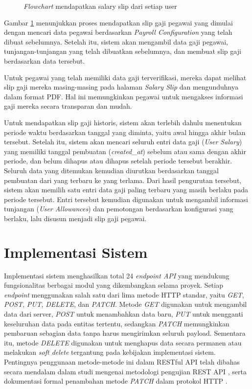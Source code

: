 \begin{figure}[H]
    \caption{\textit{Flowchart} mendapatkan salary slip dari setiap user}
    \label{fig:mendapatkan_salary_slip_dari_setiap_user}
\end{figure}

Gambar \ref{fig:mendapatkan_salary_slip_dari_setiap_user} menunjukkan proses mendapatkan slip gaji pegawai yang dimulai dengan mencari data pegawai berdasarkan \textit{Payroll Configuration} yang telah dibuat sebelumnya. Setelah itu, sistem akan mengambil data gaji pegawai, tunjangan-tunjangan yang telah dibuatkan sebelumnya, dan membuat slip gaji berdasarkan data tersebut. 

Untuk pegawai yang telah memiliki data gaji terverifikasi, mereka dapat melihat slip gaji mereka masing-masing pada halaman \textit{Salary Slip} dan mengunduhnya dalam format PDF. Hal ini memungkinkan pegawai untuk mengakses informasi gaji mereka secara transparan dan mudah.

Untuk mendapatkan slip gaji historis, sistem akan terlebih dahulu menentukan periode waktu berdasarkan tanggal yang diminta, yaitu awal hingga akhir bulan tersebut. Setelah itu, sistem akan mencari seluruh entri data gaji (\textit{User Salary}) yang memiliki tanggal pembuatan (\textit{created\_at}) sebelum atau sama dengan akhir periode, dan belum dihapus atau dihapus setelah periode tersebut berakhir. Seluruh data yang ditemukan kemudian diurutkan berdasarkan tanggal pembuatan dari yang terbaru ke yang terlama. Dari hasil pengurutan tersebut, sistem akan memilih satu entri data gaji paling terbaru yang masih berlaku pada periode tersebut. Entri tersebut kemudian digunakan untuk mengambil informasi tunjangan (\textit{User Allowances}) dan pemotongan berdasarkan konfigurasi yang berlaku, lalu disusun menjadi slip gaji pegawai.

\section{Implementasi Sistem}
Implementasi sistem menghasilkan total 24 \textit{endpoint API} yang mendukung fungsionalitas berbagai modul yang dikembangkan selama proyek. Setiap \textit{endpoint} menggunakan salah satu dari lima metode HTTP standar, yaitu \textit{GET}, \textit{POST}, \textit{PUT}, \textit{DELETE}, dan \textit{PATCH}. Metode \textit{GET} digunakan untuk mengambil data dari server, \textit{POST} untuk menambahkan data baru, \textit{PUT} untuk mengganti keseluruhan data pada entitas tertentu, sedangkan \textit{PATCH} memungkinkan pembaruan sebagian data tanpa harus mengirimkan seluruh payload. Sementara itu, metode \textit{DELETE} digunakan untuk menghapus data secara permanen atau melakukan \textit{soft delete} tergantung pada kebijakan implementasi sistem. Pentingnya penggunaan metode-metode ini dalam RESTful API telah dibahas secara mendalam dalam studi mengenai metodologi pengujian REST API \cite{ehsan2022restful}, serta dokumentasi formal penambahan metode \textit{PATCH} dalam protokol HTTP \cite{dusseault2010rfc5789}.



